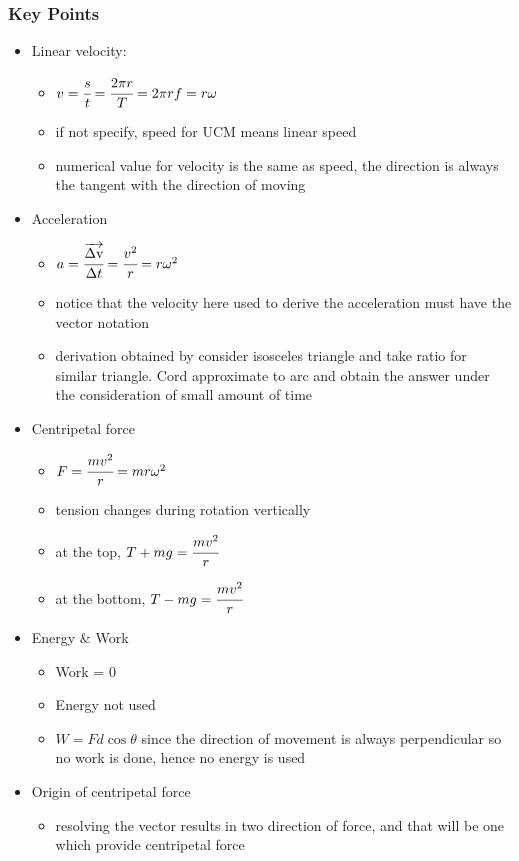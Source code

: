 \documentclass[]{article}
\begin{document}
\subsubsection{Key Points}\label{header-n45}

\begin{itemize}
\item
  Linear velocity:

  \begin{itemize}
  \item
    \(v =\cfrac{s}{t} = \cfrac{2\pi r}{T} =2\pi rf = r\omega \)
  \item
    if not specify, speed for UCM means linear speed
  \item
    numerical value for velocity is the same as speed, the direction is
    always the tangent with the direction of moving
  \end{itemize}
\item
  Acceleration

  \begin{itemize}
  \item
    \(a = \cfrac{\overrightarrow{\rm \Delta v}}{\Delta t} =  \cfrac{v^2}{r} = r\omega^2\)
  \item
    notice that the velocity here used to derive the acceleration must
    have the vector notation
  \item
    derivation obtained by consider isosceles triangle and take ratio
    for similar triangle. Cord approximate to arc and obtain the answer
    under the consideration of small amount of time
  \end{itemize}
\item
  Centripetal force

  \begin{itemize}
  \item
    \(F = \cfrac{mv^2}{r} = mr\omega^2\)
  \item
    tension changes during rotation vertically
  \item
    at the top, \(T+mg = \cfrac{mv^2}{r}\)
  \item
    at the bottom, \(T-mg = \cfrac{mv^2}{r}\)
  \end{itemize}
\item
  Energy \& Work

  \begin{itemize}
  \item
    Work = 0
  \item
    Energy not used
  \item
    \(W = Fd \cos{\theta}\) since the direction of movement is always
    perpendicular so no work is done, hence no energy is used
  \end{itemize}
\item
  Origin of centripetal force

  \begin{itemize}
  \item
    resolving the vector results in two direction of force, and that
    will be one which provide centripetal force
  \end{itemize}
\end{itemize}
\end{document}
